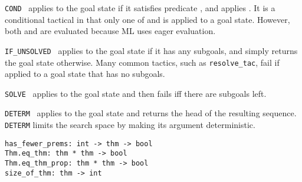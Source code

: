 \begin{isabellebody}
\begin{isamarkuptext}
  \begin{description}

  \item \verb|COND|~ applies  to
  the goal state if it satisfies predicate , and applies
  .  It is a conditional tactical in that only one of
   and  is applied to a goal state.
  However, both  and  are evaluated
  because ML uses eager evaluation.

  \item \verb|IF_UNSOLVED|~ applies  to the
  goal state if it has any subgoals, and simply returns the goal state
  otherwise.  Many common tactics, such as \verb|resolve_tac|, fail if
  applied to a goal state that has no subgoals.

  \item \verb|SOLVE|~ applies  to the goal
  state and then fails iff there are subgoals left.

  \item \verb|DETERM|~ applies  to the goal
  state and returns the head of the resulting sequence.  \verb|DETERM|
  limits the search space by making its argument deterministic.

  \end{description}%
\end{isamarkuptext}%
\isamarkuptrue%
%
\isamarkuptrue%
%
\begin{isamarkuptext}%
\begin{mldecls}
  \verb|has_fewer_prems: int -> thm -> bool| \\
  \verb|Thm.eq_thm: thm * thm -> bool| \\
  \verb|Thm.eq_thm_prop: thm * thm -> bool| \\
  \verb|size_of_thm: thm -> int| \\
  \end{mldecls}


\end{isamarkuptext}
\end{isabellebody}
